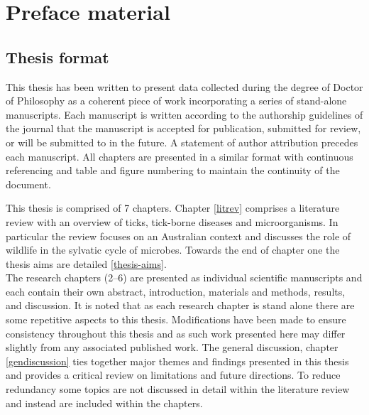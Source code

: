 \documentclass[a4paper, nobind]{templates/ociamthesis}
\renewcommand{\chaptermark}[1]{\markboth{\thechapter. #1}{\thechapter. #1}}
\begin{document}
\flushbottom

\hypertarget{preface-material}{%
\chapter*{Preface material}\label{preface-material}}

\adjustmtc 
\chaptermark{Preface}

\hypertarget{thesis-format}{%
\section*{Thesis format}\label{thesis-format}}

This thesis has been written to present data collected during the degree of Doctor of Philosophy as a coherent piece of work incorporating a series of stand-alone manuscripts.
Each manuscript is written according to the authorship guidelines of the journal that the manuscript is accepted for publication, submitted for review, or will be submitted to in the future.
A statement of author attribution precedes each manuscript.
All chapters are presented in a similar format with continuous referencing and table and figure numbering to maintain the continuity of the document.

This thesis is comprised of 7 chapters.
Chapter \ref{litrev} comprises a literature review with an overview of ticks, tick-borne diseases and microorganisms.
In particular the review focuses on an Australian context and discusses the role of wildlife in the sylvatic cycle of microbes.
Towards the end of chapter one the thesis aims are detailed \ref{thesis-aims}.\\
The research chapters (2--6) are presented as individual scientific manuscripts and each contain their own abstract, introduction, materials and methods, results, and discussion.
It is noted that as each research chapter is stand alone there are some repetitive aspects to this thesis.
Modifications have been made to ensure consistency throughout this thesis and as such work presented here may differ slightly from any associated published work.
The general discussion, chapter \ref{gendiscussion} ties together major themes and findings presented in this thesis and provides a critical review on limitations and future directions.
To reduce redundancy some topics are not discussed in detail within the literature review and instead are included within the chapters.
\end{document}
